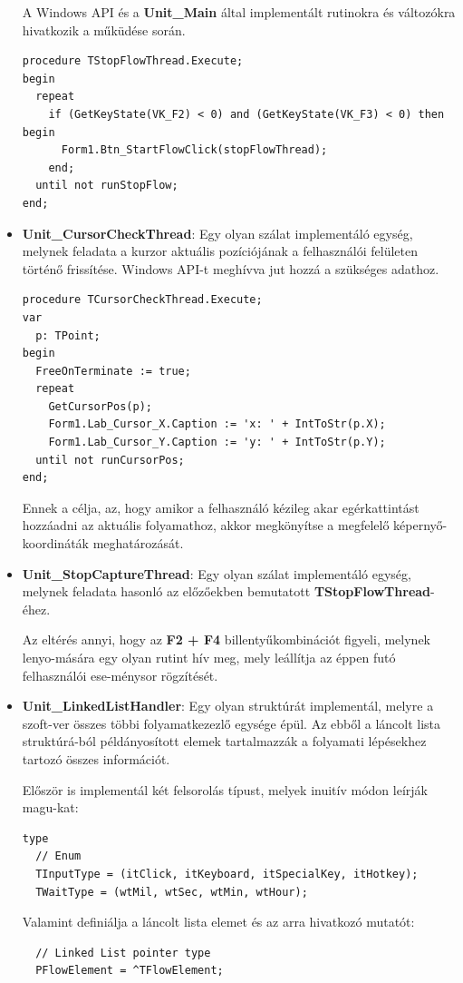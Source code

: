 \begin{itemize}
{A Windows API és a \textbf{Unit\_Main} által implementált rutinokra és változókra hivatkozik a műküdése során.
		\begin{lstlisting}
procedure TStopFlowThread.Execute;
begin
  repeat
    if (GetKeyState(VK_F2) < 0) and (GetKeyState(VK_F3) < 0) then begin
      Form1.Btn_StartFlowClick(stopFlowThread);
    end;
  until not runStopFlow;
end;
		\end{lstlisting}
	}
	\item{
		\textbf{Unit\_CursorCheckThread}: Egy olyan szálat implementáló egység, melynek feladata a kurzor aktuális pozíciójának a felhasználói felületen történő frissítése. Windows API-t meghívva jut hozzá a szükséges adathoz.
		\begin{lstlisting}
procedure TCursorCheckThread.Execute;
var
  p: TPoint;
begin
  FreeOnTerminate := true;
  repeat
    GetCursorPos(p);
    Form1.Lab_Cursor_X.Caption := 'x: ' + IntToStr(p.X);
    Form1.Lab_Cursor_Y.Caption := 'y: ' + IntToStr(p.Y);
  until not runCursorPos;
end;
		\end{lstlisting}
		Ennek a célja, az, hogy amikor a felhasználó kézileg akar egérkattintást hozzáadni az aktuális folyamathoz, akkor megkönyítse a megfelelő képernyő-koordináták meghatározását.
	}
	\item{
		\textbf{Unit\_StopCaptureThread}: Egy olyan szálat implementáló egység, melynek feladata hasonló az előzőekben bemutatott \textbf{TStopFlowThread}-éhez.

Az eltérés annyi, hogy az \textbf{F2 + F4} billentyűkombinációt figyeli, melynek lenyo\hyp{}mására egy olyan rutint hív meg, mely leállítja az éppen futó felhasználói ese\hyp{}ménysor rögzítését.
	}
	\item{
		\textbf{Unit\_LinkedListHandler}: Egy olyan struktúrát implementál, melyre a szoft\hyp{}ver összes többi folyamatkezezlő egysége épül. Az ebből a láncolt lista struktúrá\hyp{}ból példányosított elemek tartalmazzák a folyamati lépésekhez tartozó összes információt.

	Először is implementál két felsorolás típust, melyek inuitív módon leírják magu\hyp{}kat:
	\begin{lstlisting}
type
  // Enum
  TInputType = (itClick, itKeyboard, itSpecialKey, itHotkey);
  TWaitType = (wtMil, wtSec, wtMin, wtHour);
	\end{lstlisting}

	Valamint definiálja a láncolt lista elemet és az arra hivatkozó mutatót:
	\begin{lstlisting}
  // Linked List pointer type
  PFlowElement = ^TFlowElement;


\end{lstlisting}}
\end{itemize}
